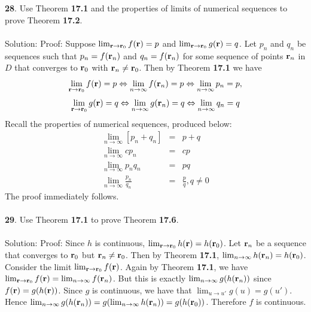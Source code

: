 \documentclass[12pt]{amsbook}
\begin{document}
\noindent
{\small\bf 28}. Use Theorem {\bf 17.1} and the properties of limits of numerical sequences
to prove Theorem {\bf 17.2}.
\\
\\
{\sc Solution}: Proof: Suppose $\lim_{{\bf r} \rightarrow {\bf r}_0}f({\bf r})=p$ and $\lim_{{\bf r} \rightarrow {\bf r}_0}g({\bf r})=q$. Let $p_n$ and $q_n$ be sequences such that $p_n=f({\bf r}_n)$ and $q_n=f({\bf r}_n)$ for some sequence of points ${\bf r}_n$ in $D$ that converges to ${\bf r}_0$ with ${\bf r}_n \neq {\bf r}_0$. Then by Theorem {\bf 17.1} we have
$$\lim_{{\bf r} \rightarrow {\bf r}_0}f({\bf r})=p \Leftrightarrow \lim_{n \rightarrow \infty}f({\bf r}_n)=p \Leftrightarrow \lim_{n \rightarrow \infty}p_n=p,$$
$$\lim_{{\bf r} \rightarrow {\bf r}_0}g({\bf r})=q \Leftrightarrow \lim_{n \rightarrow \infty}g({\bf r}_n)=q \Leftrightarrow \lim_{n \rightarrow \infty}q_n=q$$
Recall the properties of numerical sequences, produced below:
\begin{eqnarray*}
\lim _{n \rightarrow \infty}[p_n+q_n]&=&p+q\\
\lim _{n \rightarrow \infty}cp_n&=&cp\\
\lim _{n \rightarrow \infty}p_nq_n&=&pq\\
\lim _{n \rightarrow \infty}\frac{p_n}{q_n}&=&\frac{p}{q}, q\neq 0
\end{eqnarray*}
The proof immediately follows.
\\
\\
\noindent
{\small\bf 29}. Use Theorem {\bf 17.1} 
to prove Theorem {\bf 17.6}.
\\
\\
{\sc Solution}: Proof: Since $h$ is continuous, $\lim_{{\bf r} \rightarrow {\bf r}_0}h({\bf r})=h({\bf r}_0)$. Let ${\bf r}_n$ be a sequence that converges to ${\bf r}_0$ but ${\bf r}_n \neq {\bf r}_0$. Then by Theorem {\bf 17.1}, $\lim_{n \rightarrow \infty}h({\bf r}_n)=h({\bf r}_0)$. Consider the limit  $\lim_{{\bf r} \rightarrow {\bf r}_0}f({\bf r})$. Again by Theorem {\bf 17.1}, we have  $\lim_{{\bf r} \rightarrow {\bf r}_0}f({\bf r})=\lim_{n \rightarrow \infty}f({\bf r}_n)$. But this is exactly $\lim_{n \rightarrow \infty}g(h({\bf r}_n))$ since $f({\bf r})=g(h({\bf r}))$. Since $g$ is continuous, we have that $\lim_{u \rightarrow u'}g(u)=g(u')$. Hence $\lim_{n \rightarrow \infty}g(h({\bf r}_n))=g(\lim_{n \rightarrow \infty}h({\bf r}_n))=g(h({\bf r}_0))$. Therefore $f$ is continuous.

\newpage
\end{document}
